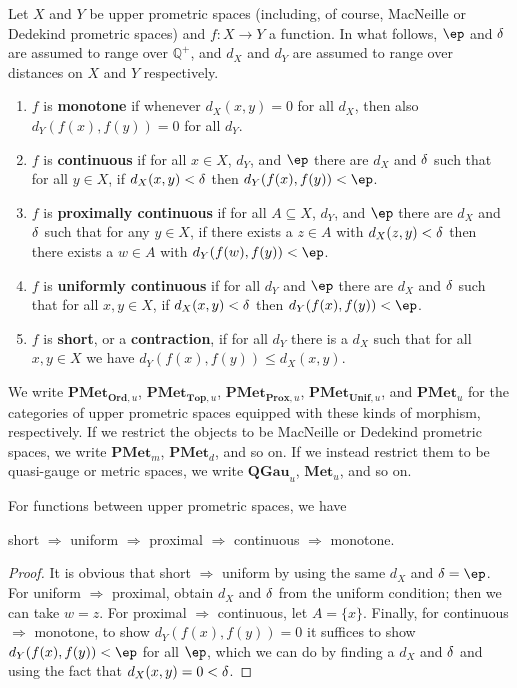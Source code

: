 \documentclass{article}
\def\Qp{\mathbb{Q}^+}
\let\implies\Rightarrow
\def\singleton#1{\{#1\}}
\def\PMet{\mathbf{PMet}}
\def\QGau{\mathbf{QGau}}
\def\Met{\mathbf{Met}}
\def\PMetu{\mathbf{PMet}_u}
\def\PMetTopu{\mathbf{PMet}_{\mathbf{Top},u}}
\def\PMetUnifu{\mathbf{PMet}_{\mathbf{Unif},u}}
\def\PMetProxu{\mathbf{PMet}_{\mathbf{Prox},u}}
\def\PMetOrdu{\mathbf{PMet}_{\mathbf{Ord},u}}
\begin{document}
\begin{defn}\label{def:pmet-maps}
  Let $X$ and $Y$ be upper prometric spaces (including, of course, MacNeille or Dedekind prometric spaces) and $f:X\to Y$ a function.
  In what follows, $\ep$ and $\delta$ are assumed to range over $\Qp$, and $d_X$ and $d_Y$ are assumed to range over distances on $X$ and $Y$ respectively.
  \begin{enumerate}
  \item $f$ is \textbf{monotone} if whenever $d_X(x,y)=0$ for all $d_X$, then also $d_Y(f(x),f(y))=0$ for all $d_Y$.
  \item $f$ is \textbf{continuous} if for all $x\in X$, $d_Y$, and $\ep$ there are $d_X$ and $\delta$ such that for all $y\in X$, if $d_X(x,y)<\delta$ then $d_Y(f(x),f(y))<\ep$.
  \item $f$ is \textbf{proximally continuous} if for all $A\subseteq X$, $d_Y$, and $\ep$ there are $d_X$ and $\delta$ such that for any $y\in X$, if there exists a $z\in A$ with $d_X(z,y)<\delta$ then there exists a $w\in A$ with $d_Y(f(w),f(y))<\ep$.
  \item $f$ is \textbf{uniformly continuous} if for all $d_Y$ and $\ep$ there are $d_X$ and $\delta$ such that for all $x,y\in X$, if $d_X(x,y)<\delta$ then $d_Y(f(x),f(y))<\ep$.
  \item $f$ is \textbf{short}, or a \textbf{contraction}, if for all $d_Y$ there is a $d_X$ such that for all $x,y\in X$ we have $d_Y(f(x),f(y)) \le d_X(x,y)$.
  \end{enumerate}
  We write $\PMetOrdu$, $\PMetTopu$, $\PMetProxu$, $\PMetUnifu$, and $\PMetu$ for the categories of upper prometric spaces equipped with these kinds of morphism, respectively.
  If we restrict the objects to be MacNeille or Dedekind prometric spaces, we write $\PMet_m$, $\PMet_d$, and so on.
  If we instead restrict them to be quasi-gauge or metric spaces, we write $\QGau_u$, $\Met_u$, and so on.
\end{defn}

\begin{thm}\label{thm:pmet-maps}
  For functions between upper prometric spaces, we have
  \begin{center}
    short $\implies$ uniform $\implies$ proximal $\implies$ continuous $\implies$ monotone.
  \end{center}
\end{thm}
\begin{proof}
  It is obvious that short $\implies$ uniform by using the same $d_X$ and $\de=\ep$.
  For uniform $\implies$ proximal, obtain $d_X$ and $\delta$ from the uniform condition; then we can take $w=z$.
  For proximal $\implies$ continuous, let $A = \singleton{x}$.
  Finally, for continuous $\implies$ monotone, to show $d_Y(f(x),f(y))=0$ it suffices to show $d_Y(f(x),f(y))<\ep$ for all $\ep$, which we can do by finding a $d_X$ and $\delta$ and using the fact that $d_X(x,y)=0 <\delta$.
\end{proof}
\end{document}
